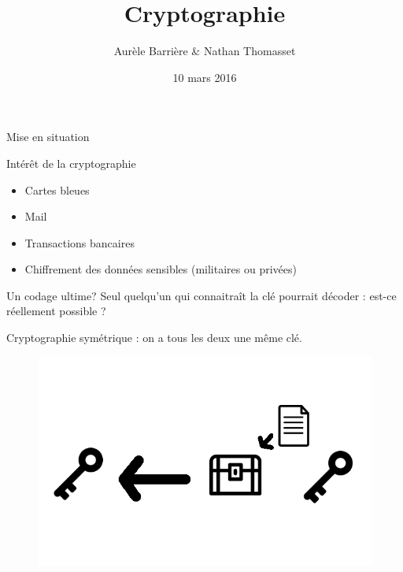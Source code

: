 \documentclass{beamer}
\author{Aurèle Barrière \& Nathan Thomasset}
\title{Cryptographie}
\date{10 mars 2016}
\begin{document}
\begin{frame}
\maketitle
\end{frame}

\begin{frame}{Mise en situation}
  \end{frame}

\begin{frame}{Intérêt de la cryptographie}
  \begin{itemize}
  \item Cartes bleues
    
  \item Mail
    
  \item Transactions bancaires
  
  \item Chiffrement des données sensibles (militaires ou privées)
\end{itemize}
\end{frame}

\begin{frame}{Un codage ultime?}
  Seul quelqu'un qui connaitraît la clé pourrait décoder : est-ce réellement possible ?

Cryptographie symétrique : on a tous les deux une même clé.
\begin{figure}
\centering
\includegraphics[scale = 0.4]{symetric.png}
\end{figure}
  \end{frame}
\end{document}
